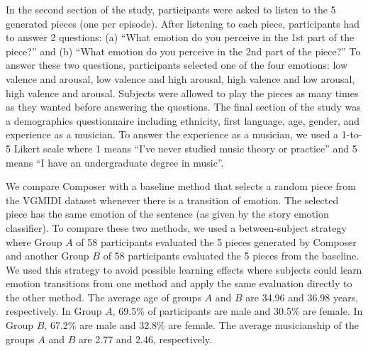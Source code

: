 In the second section of the study, participants were asked to
listen to the 5 generated pieces (one per episode). After listening to each piece, participants had
to answer 2 questions: (a) ``What emotion do you perceive in the 1st part of the piece?'' and (b) ``What emotion do you perceive in the 2nd part of the piece?'' To answer these two questions, participants selected one of the
four emotions: low valence and arousal, low valence and high arousal, high valence and low arousal, high valence and arousal.
Subjects were allowed to play the pieces as many times as they
wanted before answering the questions.
The final section of the study was a demographics questionnaire including ethnicity, first language, age, gender, and
experience as a musician. To answer the experience as a musician,
we used a 1-to-5 Likert scale where 1
means ``I've never studied music theory or practice'' and 5 means ``I
have an undergraduate degree in music''.

We compare Composer with a baseline method that selects a random piece from the
VGMIDI dataset whenever there is a transition of emotion. The selected piece has
the same emotion of the sentence (as given by the story emotion classifier). To compare these two methods, we used a
between-subject strategy where Group $A$ of 58 participants evaluated the
5 pieces generated by Composer and another Group $B$ of 58 participants
evaluated the 5 pieces from the baseline.
We used this
strategy to avoid possible learning effects where subjects
could learn emotion transitions from one method and apply the same evaluation directly to the other method. The average age of
groups $A$ and $B$ are 34.96 and 36.98 years, respectively. In Group
$A$, 69.5\% of participants are male and 30.5\% are female. In Group
$B$, 67.2\% are male and 32.8\% are female. The average musicianship of the groups $A$ and $B$ are 2.77 and 2.46, respectively.


